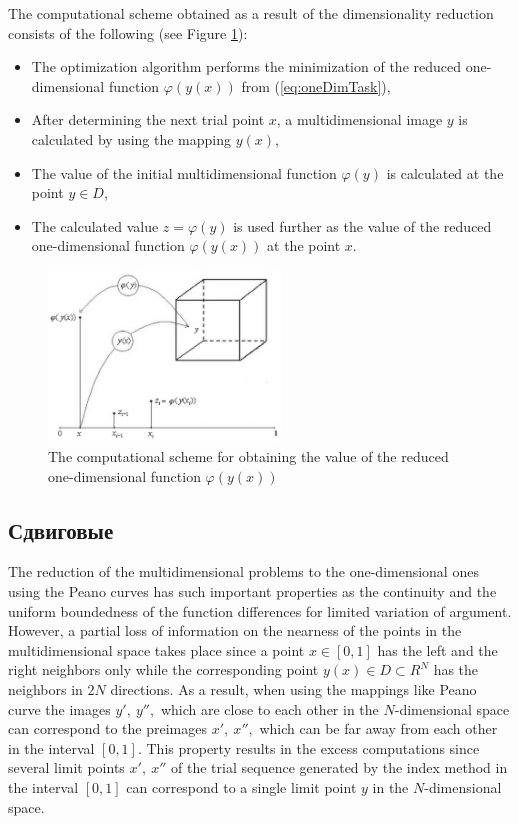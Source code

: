 \documentclass[runningheads]{llncs}
\begin{document}
\par
The computational scheme obtained as a result of the dimensionality reduction consists of the following
(see Figure \ref{fig:peanoCUsage}):
\begin{itemize}
  \item The optimization algorithm performs the minimization of the reduced one-dimensional
  function \(\varphi(y(x))\) from (\ref{eq:oneDimTask}),
  \item After determining the next trial point \(x\), a multidimensional image \(y\) is calculated by using the
mapping \(y(x)\),
  \item The value of the initial multidimensional function \(\varphi(y)\) is calculated at the point \(y\in D\),
  \item The calculated value \(z=\varphi(y)\) is used further as the value of the reduced one-dimensional function \(\varphi(y(x))\) at the point \(x\).
\end{itemize}

\begin{figure}
    \centering
    \includegraphics[width=0.55\textwidth]{pictures/peanoCUsage.eps}
    \caption{The computational scheme for obtaining the value of the reduced one-dimensional function \(\varphi(y(x))\)}
    \label{fig:peanoCUsage}
\end{figure}

\subsection{Сдвиговые}
\label{sec:shifted}

The reduction of the multidimensional problems to the one-dimensional ones using the Peano curves has such important properties as the continuity and the uniform boundedness of the function differences for limited variation of argument. However, a partial loss of information on the nearness of the points in the multidimensional space takes place since a point $x \in [0,1]$ has the left and the right neighbors only while the corresponding point $y(x) \in D \subset R^N$ has the neighbors in $2N$ directions. As a result, when using the mappings like Peano curve the images $y',\ y'',$ which are close to each other in the $N$-dimensional space can correspond to the preimages $x',\ x'',$ which can be far away from each other in the interval $[0,1]$. This property results in the excess computations since several limit points $x',\ x''$ of the trial sequence generated by the index method in the interval $[0,1]$ can correspond to a single limit point $y$ in the $N$-dimensional space.
\end{document}
